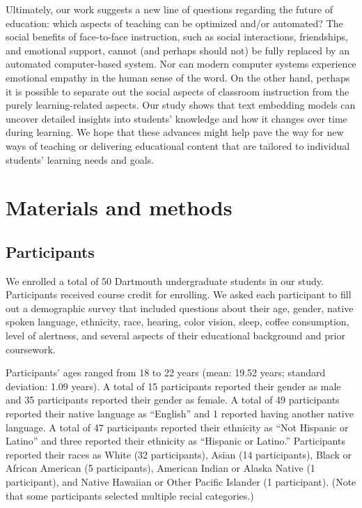 \documentclass[10pt]{article}
\begin{document}
Ultimately, our work suggests a new line of questions regarding the future of
education: which aspects of teaching can be optimized and/or automated? The
social benefits of face-to-face instruction, such as social interactions,
friendships, and emotional support, cannot (and perhaps should not) be fully
replaced by an automated computer-based system. Nor can modern computer systems
experience emotional empathy in the human sense of the word. On the other hand,
perhaps it is possible to separate out the social aspects of classroom
instruction from the purely learning-related aspects. Our study shows that text
embedding models can uncover detailed insights into students' knowledge and how
it changes over time during learning.  We hope that these advances might help
pave the way for new ways of teaching or delivering educational content
that are tailored to individual students' learning needs and goals.

\section*{Materials and methods}

\subsection*{Participants}

We enrolled a total of 50 Dartmouth undergraduate students in our study.
Participants received course credit for enrolling. We asked each participant to
fill out a demographic survey that included questions about their age, gender,
native spoken language, ethnicity, race, hearing, color vision, sleep, coffee
consumption, level of alertness, and several aspects of their educational
background and prior coursework.

Participants' ages ranged from 18 to 22 years (mean: 19.52 years;
standard deviation: 1.09 years). A total of 15 participants reported
their gender as male and 35 participants reported their gender as
female. A total of 49 participants reported their native language as
``English'' and 1 reported having another native language. A total of
47 participants reported their ethnicity as ``Not Hispanic or Latino''
and three reported their ethnicity as ``Hispanic or Latino.''
Participants reported their races as White (32 participants), Asian
(14 participants), Black or African American (5 participants),
American Indian or Alaska Native (1 participant), and Native Hawaiian or
Other Pacific Islander (1 participant). (Note that some participants
selected multiple recial categories.)
\end{document}
